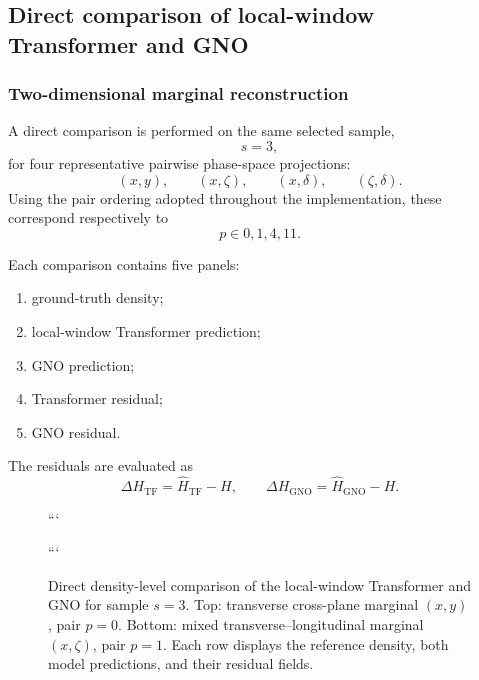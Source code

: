 \subsection{Direct comparison of local-window Transformer and GNO}
\label{subsec:results_tf_gno_comparison}

\subsubsection{Two-dimensional marginal reconstruction}
\label{subsubsec:results_tf_gno_marginals}

A direct comparison is performed on the same selected sample,
\begin{equation}
s=3,
\end{equation}
for four representative pairwise phase-space projections:
\begin{equation}
(x,y),
\qquad
(x,\zeta),
\qquad
(x,\delta),
\qquad
(\zeta,\delta).
\end{equation}
Using the pair ordering adopted throughout the implementation, these correspond respectively to
\begin{equation}
p
\in
{0,1,4,11}.
\label{eq:selected_pair_indices_results}
\end{equation}

Each comparison contains five panels:
\begin{enumerate}[label=(\roman*)]
\item ground-truth density;
\item local-window Transformer prediction;
\item GNO prediction;
\item Transformer residual;
\item GNO residual.
\end{enumerate}

The residuals are evaluated as
\begin{equation}
\Delta H_{\mathrm{TF}}
=
\widehat{H}_{\mathrm{TF}}-H,
\qquad
\Delta H_{\mathrm{GNO}}
=
\widehat{H}_{\mathrm{GNO}}-H.
\label{eq:tf_gno_density_residuals}
\end{equation}

\begin{figure}[p]
\centering
{}

```
\vspace{0.8em}


\caption{
Direct density-level comparison of the local-window Transformer and GNO for sample \(s=3\). Top: transverse cross-plane marginal \((x,y)\), pair \(p=0\). Bottom: mixed transverse--longitudinal marginal \((x,\zeta)\), pair \(p=1\). Each row displays the reference density, both model predictions, and their residual fields.
}
\label{fig:tf_gno_comparison_xy_xzeta}
```

\end{figure}

